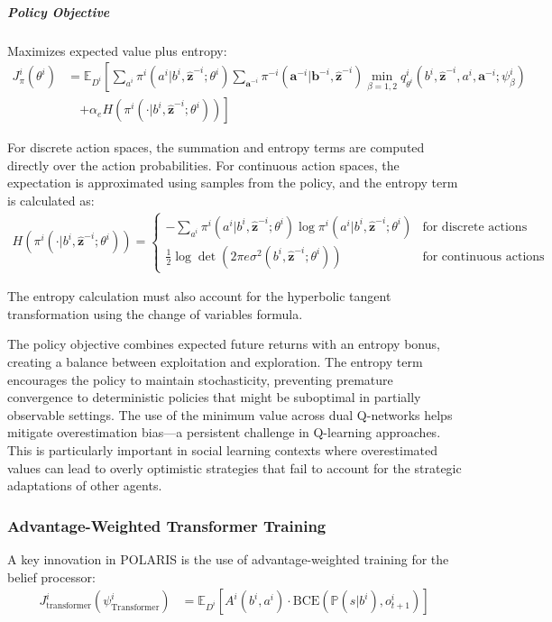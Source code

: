 \documentclass[a4paper,12pt]{report}
\begin{document}
\subparagraph{Policy Objective} Maximizes expected value plus entropy:
\begin{align}
    J^i_{\pi}(\theta^i) & = \mathbb{E}_{D^i}\left[\sum_{a^i} \pi^i(a^i|b^i, \boldsymbol{\hat{z}}^{-i}; \theta^i) \sum_{\boldsymbol{a}^{-i}} \pi^{-i}(\boldsymbol{a}^{-i}|\boldsymbol{b}^{-i}, \boldsymbol{\hat{z}}^{-i}) \min_{\beta=1,2} q^i_{\theta^i}(b^i, \boldsymbol{\hat{z}}^{-i}, a^i, \boldsymbol{a}^{-i}; \psi^i_{\beta}) \right. \\
                        & \quad \left. + \alpha_e H(\pi^i(\cdot|b^i, \boldsymbol{\hat{z}}^{-i}; \theta^i))\right]
\end{align}

For discrete action spaces, the summation and entropy terms are computed directly over the action probabilities. For continuous action spaces, the expectation is approximated using samples from the policy, and the entropy term is calculated as:
\begin{align}
    H(\pi^i(\cdot|b^i, \boldsymbol{\hat{z}}^{-i}; \theta^i)) =
    \begin{cases}
        -\sum_{a^i} \pi^i(a^i|b^i, \boldsymbol{\hat{z}}^{-i}; \theta^i) \log \pi^i(a^i|b^i, \boldsymbol{\hat{z}}^{-i}; \theta^i) & \text{for discrete actions}   \\
        \frac{1}{2}\log\det(2\pi e \sigma^2(b^i, \boldsymbol{\hat{z}}^{-i}; \theta^i))                                           & \text{for continuous actions}
    \end{cases}
\end{align}

The entropy calculation must also account for the hyperbolic tangent transformation using the change of variables formula.

The policy objective combines expected future returns with an entropy bonus, creating a balance between exploitation and exploration. The entropy term encourages the policy to maintain stochasticity, preventing premature convergence to deterministic policies that might be suboptimal in partially observable settings. The use of the minimum value across dual Q-networks helps mitigate overestimation bias—a persistent challenge in Q-learning approaches. This is particularly important in social learning contexts where overestimated values can lead to overly optimistic strategies that fail to account for the strategic adaptations of other agents.


\subsubsection{Advantage-Weighted Transformer Training} A key innovation in POLARIS is the use of advantage-weighted training for the belief processor:
\begin{align}
    J^i_{\text{transformer}}(\psi^i_{\text{Transformer}}) & = \mathbb{E}_{D^i}\left[A^i(b^i, a^i) \cdot \text{BCE}(\mathbb{P}(s|b^i), o^i_{t+1})\right]
\end{align}
\end{document}
